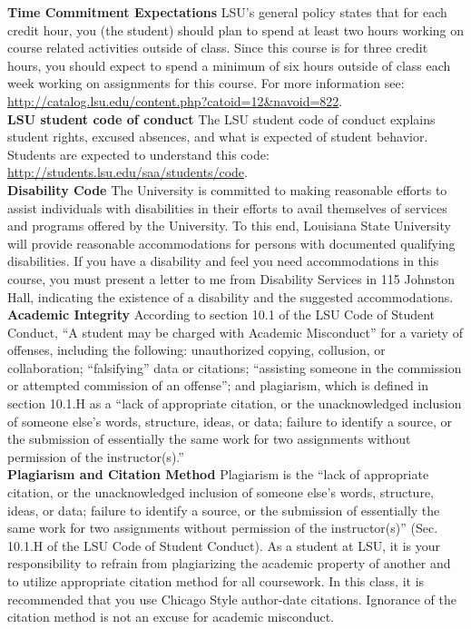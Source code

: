 \documentclass[11pt,article,oneside]{memoir}
\begin{document}
\noindent \textbf{Time Commitment Expectations}
LSU's general policy states that for each credit hour, you (the student) should plan to
spend at least two hours working on course related activities outside of class. Since this course is for three credit hours, you should expect to spend a minimum of six hours outside of class each week working on assignments for this course. For more information see: 
\url{http://catalog.lsu.edu/content.php?catoid=12&navoid=822}.\\

\noindent \textbf{LSU student code of conduct}
The LSU student code of conduct explains student rights, excused absences, and what is expected of student behavior. Students are expected to understand this code:  \url{http://students.lsu.edu/saa/students/code}.\\ %

\noindent \textbf{Disability Code}
The University is committed to making reasonable efforts to assist individuals with disabilities in
their efforts to avail themselves of services and programs offered by the University. To this end,
Louisiana State University will provide reasonable accommodations for persons with
documented qualifying disabilities. If you have a disability and feel you need accommodations in
this course, you must present a letter to me from Disability Services in 115 Johnston Hall,
indicating the existence of a disability and the suggested accommodations.\\

\noindent \textbf{Academic Integrity}
According to section 10.1 of the LSU Code of Student Conduct, ``A student may be charged with Academic Misconduct'' for a variety of offenses, including the following: unauthorized copying, collusion, or collaboration; ``falsifying'' data or citations; ``assisting someone in the commission or attempted commission of an offense''; and plagiarism, which is defined in section 10.1.H as a ``lack of appropriate citation, or the unacknowledged inclusion of someone else's words, structure, ideas, or data; failure to identify a source, or the submission of essentially the same work for two assignments without permission of the instructor(s).''\\

\noindent \textbf{Plagiarism and Citation Method}
Plagiarism is the ``lack of appropriate citation, or the unacknowledged inclusion of someone else's words, structure, ideas, or data; failure to identify a source, or the submission of essentially the same work for two assignments without permission of the instructor(s)'' (Sec. 10.1.H of the LSU Code of Student Conduct). As a student at LSU, it is your responsibility to refrain from plagiarizing the academic property of another and to utilize appropriate citation method for all coursework. In this class, it is recommended that you use Chicago Style author-date citations. Ignorance of the citation method is not an excuse for academic misconduct.
\end{document}

